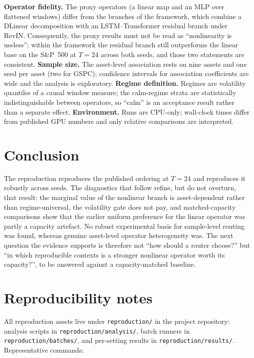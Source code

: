 \documentclass[preprint,12pt]{elsarticle}
\begin{document}
\textbf{Operator fidelity.} The proxy operators (a linear map and an MLP over flattened
windows) differ from the branches of the framework, which combine a DLinear decomposition with
an LSTM--Transformer residual branch under RevIN. Consequently, the proxy results must not be
read as ``nonlinearity is useless''; within the framework the residual branch still outperforms
the linear base on the S\&P~500 at $T=24$ across both seeds, and those two statements are
consistent.
\textbf{Sample size.} The asset-level association rests on nine assets and one seed per asset
(two for GSPC); confidence intervals for association coefficients are wide and the analysis is
exploratory.
\textbf{Regime definition.} Regimes are volatility quantiles of a causal window measure; the
calm-regime strata are statistically indistinguishable between operators, so ``calm'' is an
acceptance result rather than a separate effect.
\textbf{Environment.} Runs are CPU-only; wall-clock times differ from published GPU numbers and
only relative comparisons are interpreted.

\section{Conclusion}
\label{sec:conclusion}

The reproduction reproduces the published ordering at $T=24$ and reproduces it robustly across
seeds. The diagnostics that follow refine, but do not overturn, that result: the marginal value
of the nonlinear branch is asset-dependent rather than regime-universal, the volatility gate
does not pay, and matched-capacity comparisons show that the earlier uniform preference for the
linear operator was partly a capacity artefact. No robust experimental basis for sample-level
routing was found, whereas genuine asset-level operator heterogeneity was. The next question the
evidence supports is therefore not ``how should a router choose?'' but ``in which reproducible
contexts is a stronger nonlinear operator worth its capacity?'', to be answered against a
capacity-matched baseline.

\appendix
\section{Reproducibility notes}
\label{app:repro}

All reproduction assets live under \texttt{reproduction/} in the project repository:
analysis scripts in \texttt{reproduction/analysis/}, batch runners in
\texttt{reproduction/batches/}, and per-setting results in \texttt{reproduction/results/}.
Representative commands:
\end{document}
